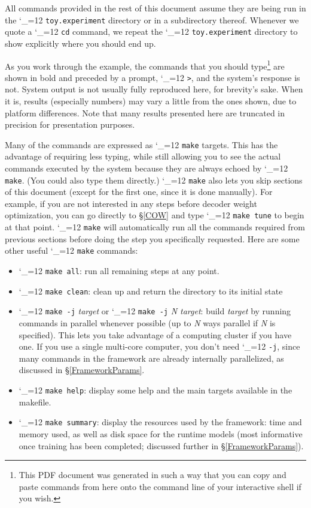 \documentclass[11pt,letterpaper]{article}
\def\code{\begingroup\catcode`\_=12 \codex}
\newcommand{\codex}[1]{\texttt{#1}\endgroup}
\begin{document}
All commands provided in the rest of this document assume they are being run in
the \code{toy.experiment} directory or in a subdirectory thereof.  Whenever we
quote a \code{cd} command, we repeat the \code{toy.experiment} directory to
show explicitly where you should end up.

As you work through the example, the commands that you should type\footnote{This
   PDF document was generated in such a way that you can copy and paste commands
   from here onto the command line of your interactive shell if you wish.}
are shown in bold and preceded by a prompt, \code{>}, and the system's response
is not.  System output is not usually fully reproduced here, for brevity's
sake. When it is, results (especially numbers) may vary a little from the ones
shown, due to platform differences. Note that many results presented here are
truncated in precision for presentation purposes.

Many of the commands are expressed as \code{make} targets. This has the
advantage of requiring less typing, while still allowing you to see the actual
commands executed by the system because they are always echoed by \code{make}.
(You could also type them directly.) \code{make} also lets you skip
sections of this document (except for the first one, since it is done
manually). For example, if you are not interested in any steps before decoder
weight optimization, you can go directly to \S\ref{COW} and type
\code{make tune} to begin at that point. \code{make} will automatically run all
the commands required from previous sections before doing the step you
specifically requested. Here are some other useful \code{make} commands:
\begin{itemize}
\item \code{make all}: run all remaining steps at any point.
\item \code{make clean}: clean up and return the directory to its initial state
\item \code{make -j} \emph{target} or \code{make -j} \emph{N target}: build
      \emph{target} by running commands in parallel whenever possible (up to
      \emph{N} ways parallel if \emph{N} is specified). This lets you take
      advantage of a computing cluster if you have one. If you use a single
      multi-core computer, you don't need \code{-j}, since many commands in the
      framework are already internally parallelized, as discussed in
      \S\ref{FrameworkParams}.
\item \code{make help}: display some help and the main targets available in
      the makefile.
\item \code{make summary}: display the resources used by the framework: time
      and memory used, as well as disk space for the runtime models (most
      informative once training has been completed; discussed further in
      \S\ref{FrameworkParams}).
\end{itemize}
\end{document}
